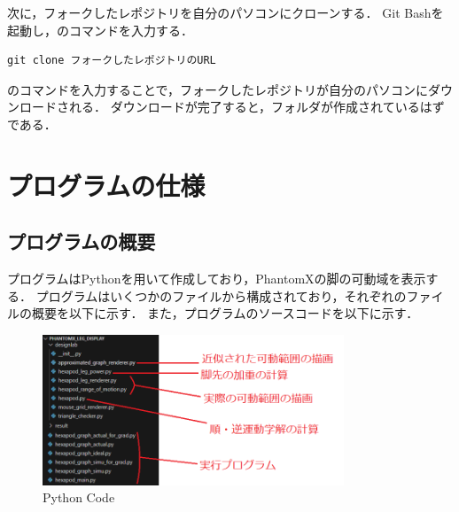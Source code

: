 次に，フォークしたレポジトリを自分のパソコンにクローンする．
Git Bashを起動し，のコマンドを入力する．

\begin{lstlisting}[caption=Gitのクローンコマンド, label=lst:git_clone]
  git clone フォークしたレポジトリのURL
\end{lstlisting}


のコマンドを入力することで，フォークしたレポジトリが自分のパソコンにダウンロードされる．
ダウンロードが完了すると，フォルダが作成されているはずである．



\section{プログラムの仕様}

\subsection{プログラムの概要}
プログラムはPythonを用いて作成しており，PhantomXの脚の可動域を表示する．
プログラムはいくつかのファイルから構成されており，それぞれのファイルの概要を以下に示す．
また，プログラムのソースコードを以下に示す．

\begin{figure}[htbp]
  \begin{center}
    \includegraphics[width=90mm, clip]{figure/appendix/python.png}
    \caption{Python Code}
    \label{fig:ch1_nedo_spot} %
  \end{center}
\end{figure}


